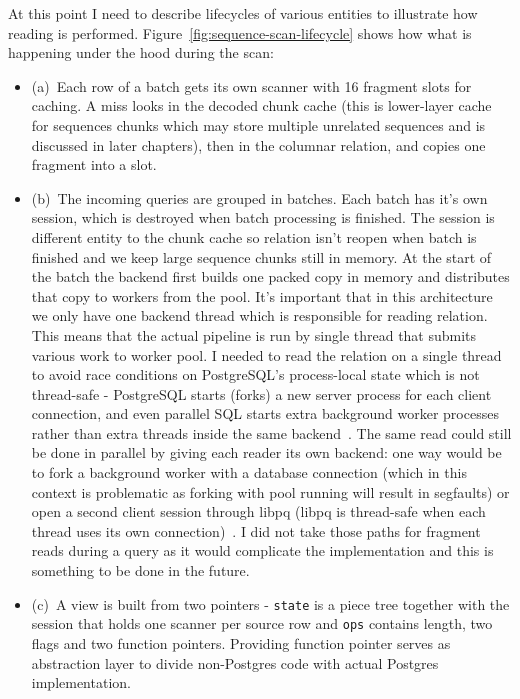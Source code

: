 At this point I need to describe lifecycles of various entities to illustrate how reading is performed.
Figure~\ref{fig:sequence-scan-lifecycle} shows how what is happening under the hood during the scan:
\begin{itemize}
  \item (a)~Each row of a batch gets its own scanner with 16 fragment slots for caching. A miss looks in the decoded chunk cache
  (this is lower-layer cache for sequences chunks which may store multiple unrelated sequences and is discussed in later chapters),
  then in the columnar relation, and copies one fragment into a slot.
  \item (b)~The incoming queries are grouped in batches. Each batch has it's own session, which is destroyed when batch processing is finished.
  The session is different entity to the chunk cache so relation isn't reopen when batch is finished and we keep large sequence chunks still in memory.
  At the start of the batch the backend first builds one packed copy in memory and distributes that copy to workers from the pool.
  It's important that in this architecture we only have one backend thread which is responsible for reading relation.
  This means that the actual pipeline is run by single thread that submits various work to worker pool.
  I needed to read the relation on a single thread to avoid race conditions on PostgreSQL's process-local state which is not thread-safe -
  PostgreSQL starts (forks) a new server process for each client connection, and even parallel SQL starts extra background worker processes rather than extra threads inside the 
  same backend~\autocite{postgresql17_tutorial_arch,postgresql17_how_parallel_query}.
  The same read could still be done in parallel by giving each reader its own backend: one way would be to fork a background worker with a database connection
  (which in this context is problematic as forking with pool running will result in segfaults) 
  or open a second client session through libpq (libpq is thread-safe when each thread uses its own connection)~\autocite{postgresql17_bgworker,postgresql17_libpq_threading}.
  I did not take those paths for fragment reads during a query as it would complicate the implementation and this is something to be done in the future.
  \item (c)~A view is built from two pointers - \texttt{state} is a piece tree together with the session that holds one scanner per source row and \texttt{ops} contains length, two flags and 
  two function pointers. Providing function pointer serves as abstraction layer to divide non-Postgres code with actual Postgres implementation.

\end{itemize}
